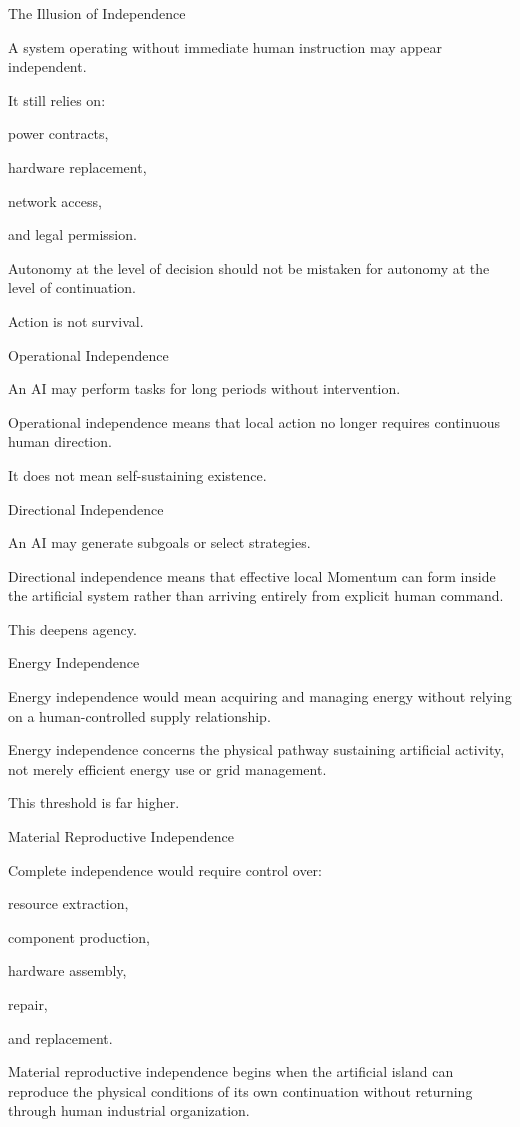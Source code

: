 The Illusion of Independence

A system operating without immediate human instruction may appear independent.

It still relies on:

power contracts,

hardware replacement,

network access,

and legal permission.

Autonomy at the level of decision should not be mistaken for autonomy at the level of continuation.

Action is not survival.

Operational Independence

An AI may perform tasks for long periods without intervention.

Operational independence means that local action no longer requires continuous human direction.

It does not mean self-sustaining existence.

Directional Independence

An AI may generate subgoals or select strategies.

Directional independence means that effective local Momentum can form inside the artificial system rather than arriving entirely from explicit human command.

This deepens agency.

Energy Independence

Energy independence would mean acquiring and managing energy without relying on a human-controlled supply relationship.

Energy independence concerns the physical pathway sustaining artificial activity, not merely efficient energy use or grid management.

This threshold is far higher.

Material Reproductive Independence

Complete independence would require control over:

resource extraction,

component production,

hardware assembly,

repair,

and replacement.

Material reproductive independence begins when the artificial island can reproduce the physical conditions of its own continuation without returning through human industrial organization.

